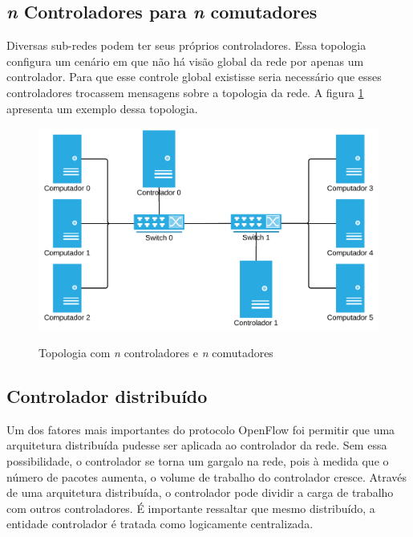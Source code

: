 \subsection{\emph{n} Controladores para \emph{n} comutadores}

Diversas sub-redes podem ter seus próprios controladores.
Essa topologia configura um cenário em que não há visão global da rede 
por apenas um controlador. 
Para que esse controle global existisse seria necessário que esses 
controladores trocassem mensagens sobre a topologia da rede.
A figura \ref{fig:n-controllers-n-switches} apresenta um exemplo dessa 
topologia.

\begin{figure}[h!]
    \centering
    \includegraphics[scale=0.9]{img/n-controllers-n-switches}
    \label{fig:n-controllers-n-switches}
    \caption{Topologia com \emph{n} controladores e \emph{n} comutadores}
\end{figure}


\subsection{Controlador distribuído}

Um dos fatores mais importantes do protocolo OpenFlow foi permitir que 
uma arquitetura distribuída pudesse ser aplicada ao controlador da rede.
Sem essa possibilidade, o controlador se torna um gargalo na rede, 
pois à medida que o número de pacotes aumenta, o volume de trabalho do 
controlador cresce. 
Através de uma arquitetura distribuída, o controlador pode dividir a carga 
de trabalho com outros controladores.
É importante ressaltar que mesmo distribuído, a entidade controlador
é tratada como logicamente centralizada.

